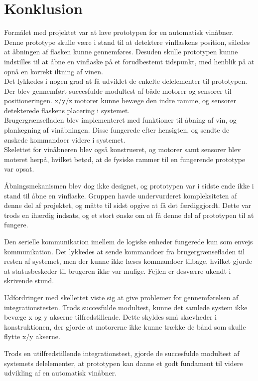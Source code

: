 \chapter{Konklusion}
Formålet med projektet var at lave prototypen for en automatisk vinåbner. Denne prototype skulle være i stand til at detektere vinflaskens position, således at
åbningen af flasken kunne gennemføres. Desuden skulle prototypen kunne indstilles til at åbne en vinflaske på et forudbestemt tidspunkt, med henblik på at 
opnå en korrekt iltning af vinen.\\

Det lykkedes i nogen grad at få udviklet de enkelte delelementer til prototypen. Der blev gennemført succesfulde modultest af både motorer og sensorer til 
positioneringen. x/y/z motorer kunne bevæge den indre ramme, og sensorer detekterede flaskens placering i systemet.\\

Brugergrænsefladen blev implementeret med funktioner til åbning af vin, og planlægning af vinåbningen. Disse fungerede efter hensigten, og sendte de ønskede
kommandoer videre i systemet.\\

Skelettet for vinåbneren blev også konstrueret, og motorer samt sensorer blev moteret herpå, hvilket betød, at de fysiske rammer til en fungerende prototype var opsat.

Åbningsmekanismen blev dog ikke designet, og prototypen var i sidste ende ikke i stand til åbne en vinflaske. Gruppen havde undervurderet kompleksiteten af denne
del af projektet, og måtte til sidst opgive at få det færdiggjordt. Dette var trods en ihærdig indsats, og et stort ønske om at få denne del af prototypen til
at fungere.

Den serielle kommunikation imellem de logiske enheder fungerede kun som envejs kommunikation. Det lykkedes at sende kommandoer fra brugergrænsefladen til
resten af systemet, men der kunne ikke læses kommandoer tilbage, hvilket gjorde at statusbeskeder til brugeren ikke var mulige. Fejlen er desværre ukendt i
skrivende stund.

Udfordringer med skellettet viste sig at give problemer for gennemførelsen af integrationstesten. Trods succesfulde modultest, kunne det samlede system ikke
bevæge x og y akserne tilfredstillende. Dette skyldes små skævheder i konstruktionen, der gjorde at motorerne ikke kunne trække de bånd som skulle flytte x/y
akserne.       

Trods en utilfredstillende integrationstest, gjorde de succesfulde modultest af systemets delelementer, at prototypen kan danne et godt fundament til videre 
udvikling af en automatisk vinåbner.